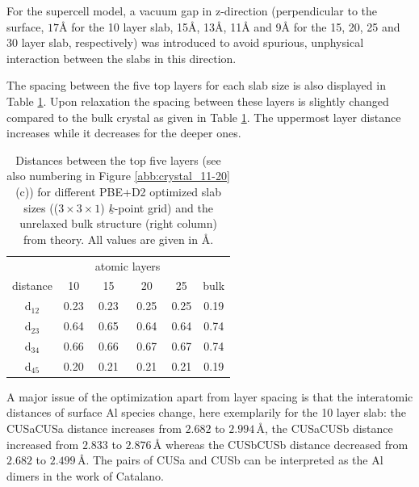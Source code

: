 \documentclass[11pt,DIV=13,BCOR=5mm,a4paper,headinclude]{scrbook}
\renewcommand{\vec}[1]{\underline{#1}}
\begin{document}
For the supercell model, a vacuum gap in z-direction (perpendicular to the surface, $17$\AA{} for the 10 layer slab, 15\AA{}, 13\AA{}, 11\AA{} and 9\AA{} for the 15, 20, 25 and 30 layer slab, respectively) was introduced to avoid spurious, unphysical interaction between the slabs in this direction.

The spacing between the five top layers for each slab size is also displayed in Table \ref{tab:layer-dist}.
Upon relaxation the spacing between these layers is slightly changed compared to the bulk crystal as given in Table \ref{tab:layer-dist}.
The uppermost layer distance increases while it decreases for the deeper ones.
\begin{table}[!ht]
  \centering
 \caption{Distances between the top five layers (see also numbering in Figure \ref{abb:crystal_11-20}(c)) for different PBE+D2 optimized slab sizes (($3\times 3\times 1$) $\vec{k}$-point grid) and the unrelaxed bulk structure (right column) from theory.
All values are given in \AA.} 
\vspace*{.2cm}
\begin{tabular}{c|cccc|c}
\toprule
 & &\multicolumn{2}{c}{atomic layers}&&\\
    distance    & 10   & 15   & 20   & 25   &bulk \\\midrule
 d$_{12}$	&0.23 &0.23 &0.25 &0.25 &0.19 \\
 d$_{23}$	&0.64 &0.65 &0.64 &0.64 &0.74 \\
 d$_{34}$	&0.66 &0.66 &0.67 &0.67 &0.74 \\
 d$_{45}$	&0.20 &0.21 &0.21 &0.21 &0.19 \\\bottomrule
  \end{tabular}
  \label{tab:layer-dist}
\end{table}
A major issue of the optimization apart from layer spacing is that the interatomic distances of surface Al species change, here exemplarily for the 10 layer slab: the CUSa\textendash CUSa distance increases from $2.682$ to $2.994\,$\AA{}, the CUSa\textendash CUSb distance increased from $2.833$ to $2.876\,$\AA{} whereas the CUSb\textendash CUSb distance decreased from $2.682$ to $2.499\,$\AA{}.
The pairs of CUSa and CUSb can be interpreted as the Al dimers in the work of Catalano\cite{catalano}.
\end{document}
